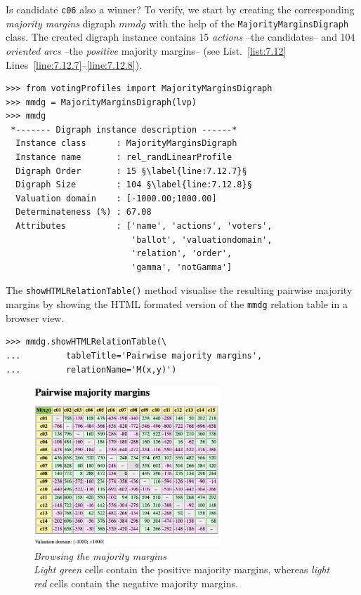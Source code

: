 Is candidate \texttt{c06} also a \Condorcet winner? To verify, we start by creating the corresponding \emph{majority margins} digraph $mmdg$ with the help of the \texttt{MajorityMarginsDi\-graph} class. The created digraph instance contains 15 \emph{actions} --the candidates-- and 104 \emph{oriented arcs} --the \emph{positive} majority margins-- (see List.~\vref{list:7.12} Lines~\ref{line:7.12.7}--\ref{line:7.12.8}).
\begin{lstlisting}[caption={A majority margins digraph constructed from a linear voting profile},label=list:7.12]
>>> from votingProfiles import MajorityMarginsDigraph
>>> mmdg = MajorityMarginsDigraph(lvp)
>>> mmdg
 *------- Digraph instance description ------*
  Instance class      : MajorityMarginsDigraph
  Instance name       : rel_randLinearProfile
  Digraph Order       : 15 §\label{line:7.12.7}§ 
  Digraph Size        : 104 §\label{line:7.12.8}§ 
  Valuation domain    : [-1000.00;1000.00]
  Determinateness (%) : 67.08
  Attributes          : ['name', 'actions', 'voters',
                         'ballot', 'valuationdomain',
                         'relation', 'order',
                         'gamma', 'notGamma']
\end{lstlisting}

The \texttt{showHTMLRelationTable()} method visualise the resulting pairwise majority margins by showing the HTML formated version of the \texttt{mmdg} relation table in a browser view.
\begin{lstlisting}
>>> mmdg.showHTMLRelationTable(\
...         tableTitle='Pairwise majority margins',
...         relationName='M(x,y)')
\end{lstlisting}
\begin{figure}[ht]
\sidecaption[t]
\includegraphics[width=7cm]{Figures/7-4-majorityMargins.png}
\caption[Browsing the majority margins]{\emph{Browsing the majority margins}\\ \emph{Light green} cells contain the positive majority margins, whereas \emph{light red} cells contain the negative majority margins.}
\label{fig:7.4}       %
\end{figure}

